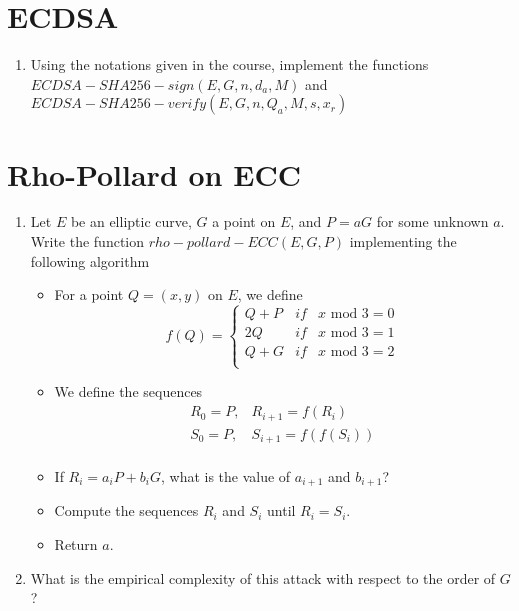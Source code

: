 \documentclass[12pt]{article}
\begin{document}
\section{ECDSA}
\begin{enumerate}
	\item Using the notations given in the course, implement the functions $ECDSA-SHA256-sign(E,G,n,d_a,M)$ and $ECDSA-SHA256-verify(E,G,n,Q_a,M,s,x_r)$
\end{enumerate}

\section{Rho-Pollard on ECC}
\begin{enumerate}
	\item Let $E$ be an elliptic curve, $G$ a point on $E$, and $P=aG$ for some unknown $a$. Write the function $rho-pollard-ECC(E,G,P)$ implementing the following algorithm
	\begin{itemize}
		\item For a point $Q=(x,y)$ on $E$, we define
		\[ f(Q) =
			\left\{
				\begin{array}{lll}
					Q + P&if & x \text{ mod } 3 = 0 \\
					2Q   &if & x \text{ mod } 3 = 1 \\
					Q + G&if & x \text{ mod } 3 = 2 \\
				\end{array}
			\right.
		\]
		\item We define the sequences
		\[
			\begin{array}{ll}
				R_0=P,& R_{i+1}=f(R_i) \\
				S_0=P,& S_{i+1}=f(f(S_i)) \\
			\end{array}
		\]
		\item If $R_i = a_iP + b_iG$, what is the value of $a_{i+1}$ and $b_{i+1}$?
		\item Compute the sequences $R_i$ and $S_i$ until $R_i=S_i$.
		\item Return $a$.
	\end{itemize}
	\item What is the empirical complexity of this attack with respect to the order of $G$?
\end{enumerate}
\end{document}
